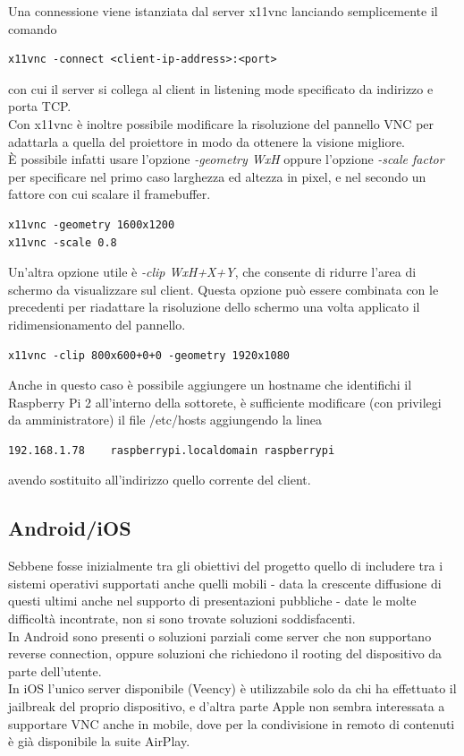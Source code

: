 \noindent Una connessione viene istanziata dal server x11vnc lanciando semplicemente il comando
\begin{lstlisting}
x11vnc -connect <client-ip-address>:<port>
\end{lstlisting}
con cui il server si collega al client in listening mode specificato da indirizzo e porta TCP.\\

Con x11vnc è inoltre possibile modificare la risoluzione del pannello VNC per adattarla a quella del proiettore in modo da ottenere la visione migliore. \\
È possibile infatti usare l'opzione \textit{-geometry WxH} oppure l'opzione \textit{-scale factor} per specificare nel primo caso larghezza ed altezza in pixel, e nel secondo un fattore con cui scalare il framebuffer.

\begin{lstlisting}
x11vnc -geometry 1600x1200
x11vnc -scale 0.8
\end{lstlisting}

Un'altra opzione utile è \textit{-clip WxH+X+Y}, che consente di ridurre l'area di schermo da visualizzare sul client. Questa opzione può essere combinata con le precedenti per riadattare la risoluzione dello schermo una volta applicato il ridimensionamento del pannello.

\begin{lstlisting}
x11vnc -clip 800x600+0+0 -geometry 1920x1080
\end{lstlisting}

Anche in questo caso è possibile aggiungere un hostname che identifichi il Raspberry Pi 2 all'interno della sottorete, è sufficiente modificare (con privilegi da amministratore) il file /etc/hosts aggiungendo la linea

\begin{lstlisting}
192.168.1.78    raspberrypi.localdomain raspberrypi
\end{lstlisting}

avendo sostituito all'indirizzo quello corrente del client.\\

\subsection{Android/iOS}
Sebbene fosse inizialmente tra gli obiettivi del progetto quello di includere tra i sistemi operativi supportati anche quelli mobili - data la crescente diffusione di questi ultimi anche nel supporto di presentazioni pubbliche - date le molte difficoltà incontrate, non si sono trovate soluzioni soddisfacenti.\\
In Android sono presenti o soluzioni parziali come server che non supportano reverse connection, oppure soluzioni che richiedono il rooting del dispositivo da parte dell'utente.\\
In iOS l'unico server disponibile (Veency) è utilizzabile solo da chi ha effettuato il jailbreak del proprio dispositivo, e d'altra parte Apple non sembra interessata a supportare VNC anche in mobile, dove per la condivisione in remoto di contenuti è già disponibile la suite AirPlay.
